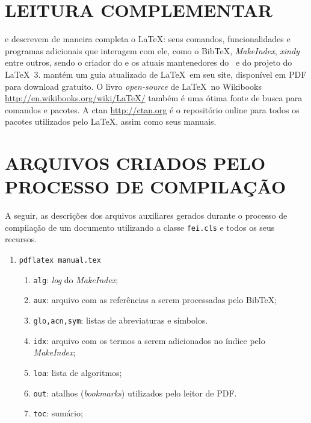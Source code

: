 \documentclass[xindy,rascunho]{fei}
\begin{document}
\begin{teorema}
	\chapter{LEITURA COMPLEMENTAR}
	
	 e  descrevem de maneira completa o \LaTeX: seus comandos, funcionalidades e programas adicionais que interagem com ele, como o Bib\TeX, \emph{MakeIndex}, \emph{xindy} entre outros, sendo  o criador do \LaTeXe e  os atuais mantenedores do \LaTeXe\ e do projeto do \LaTeX\ 3.  mantém um guia atualizado de \LaTeX\ em seu site, disponível em PDF para download gratuito. O livro \emph{open-source} de \LaTeX\ no Wikibooks \url{http://en.wikibooks.org/wiki/LaTeX/} também é uma ótima fonte de busca para comandos e pacotes. A \gls{ctan} \url{http://ctan.org} é o repositório online para todos os pacotes utilizados pelo \LaTeX, assim como seus manuais.
	
	
	
	\appendix
	
	\chapter{ARQUIVOS CRIADOS PELO PROCESSO DE COMPILAÇÃO} \label{chap:arquivos}
	
	A seguir, as descrições dos arquivos auxiliares gerados durante o processo de compilação de um documento utilizando a classe \texttt{fei.cls} e todos os seus recursos.
		
	\begin{enumerate}
	
	\item\verb+pdflatex manual.tex+
	\begin{enumerate}
	\item \texttt{alg}: \emph{log} do \emph{MakeIndex};
	\item \texttt{aux}: arquivo com as referências a serem processadas pelo Bib\TeX;
	\item \texttt{glo,acn,sym}: listas de abreviaturas e símbolos.
	\item \texttt{idx}: arquivo com os termos a serem adicionados no índice pelo \emph{MakeIndex};
	\item \texttt{loa}: lista de algoritmos;
	\item \texttt{out}: atalhos (\emph{bookmarks}) utilizados pelo leitor de PDF.
	\item \texttt{toc}: sumário;
	\end{enumerate}	
	

\end{enumerate}
\end{teorema}
\end{document}
